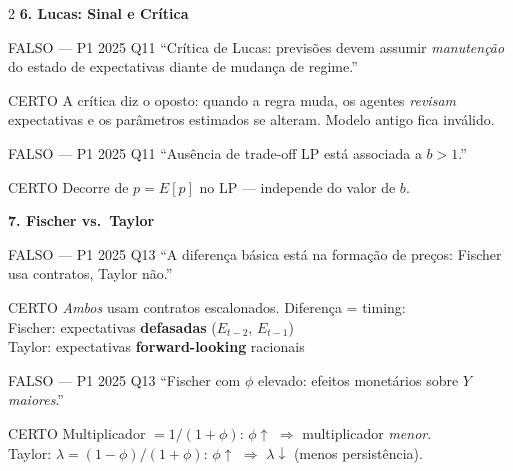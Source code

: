 \documentclass[10pt, a4paper]{article}
\begin{document}
\begin{multicols}{2}
\vspace{0.5em}
\textbf{\color{azul}\large 6. Lucas: Sinal e Crítica}

\begin{errobox}{FALSO — P1 2025 Q11}
``Crítica de Lucas: previsões devem assumir \emph{manutenção} do estado de expectativas diante de mudança de regime.''
\end{errobox}
\vspace{0.3em}
\begin{certobox}{CERTO}
A crítica diz o oposto: quando a regra muda, os agentes \emph{revisam} expectativas e os parâmetros estimados se alteram. Modelo antigo fica inválido.
\end{certobox}

\begin{errobox}{FALSO — P1 2025 Q11}
``Ausência de trade-off LP está associada a $b > 1$.''
\end{errobox}
\vspace{0.3em}
\begin{certobox}{CERTO}
Decorre de $p = E[p]$ no LP — independe do valor de $b$.
\end{certobox}

\vspace{0.5em}
\textbf{\color{azul}\large 7. Fischer vs.\ Taylor}

\begin{errobox}{FALSO — P1 2025 Q13}
``A diferença básica está na formação de preços: Fischer usa contratos, Taylor não.''
\end{errobox}
\vspace{0.3em}
\begin{certobox}{CERTO}
\emph{Ambos} usam contratos escalonados. Diferença = timing:\\
Fischer: expectativas \textbf{defasadas} ($E_{t-2}$, $E_{t-1}$)\\
Taylor: expectativas \textbf{forward-looking} racionais
\end{certobox}

\begin{errobox}{FALSO — P1 2025 Q13}
``Fischer com $\phi$ elevado: efeitos monetários sobre $Y$ \emph{maiores}.''
\end{errobox}
\vspace{0.3em}
\begin{certobox}{CERTO}
Multiplicador $= 1/(1+\phi)$: $\phi\uparrow$ $\Rightarrow$ multiplicador \emph{menor}.\\
Taylor: $\lambda = (1-\phi)/(1+\phi)$: $\phi\uparrow$ $\Rightarrow$ $\lambda\downarrow$ (menos persistência).
\end{certobox}


\end{multicols}
\end{document}

